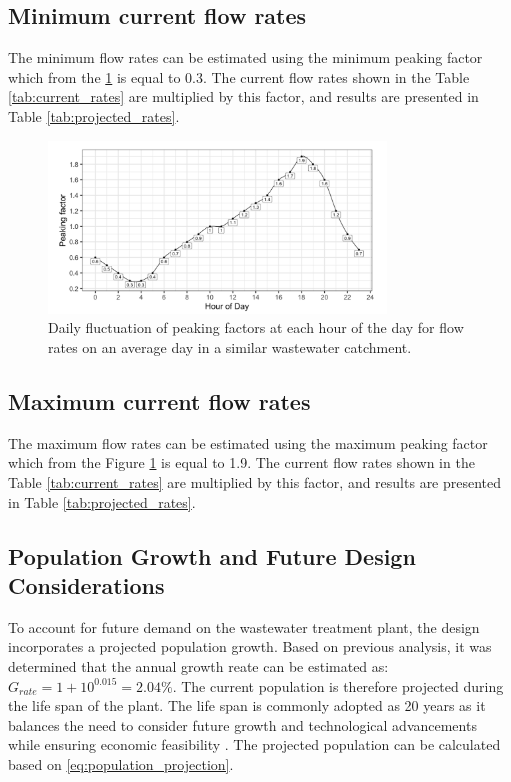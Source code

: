 \documentclass[12pt]{article}
\begin{document}
\subsection{Minimum current flow rates}
\label{sec:minimum_current_flowrates}

The minimum flow rates can be estimated using the minimum peaking factor
which from the \ref{fig:peaking_factor} is equal to 0.3. The current flow rates shown in the Table \ref{tab:current_rates}
are multiplied by this factor, and results are presented in Table \ref{tab:projected_rates}.

\begin{figure}[h]
  \centering
  \includegraphics[width=0.8\textwidth]{../images/peaking_factor.png}
  \caption{Daily fluctuation of peaking factors at each hour of the day for flow rates on an average day in a similar wastewater catchment.}
  \label{fig:peaking_factor}
\end{figure}

\subsection{Maximum current flow rates}
\label{sec:maximum_current_flowrates}

The maximum flow rates can be estimated using the maximum peaking factor
which from the Figure \ref{fig:peaking_factor} is equal to 1.9. The current flow rates shown in the Table \ref{tab:current_rates}
are multiplied by this factor, and results are presented in Table \ref{tab:projected_rates}.

\subsection*{Population Growth and Future Design Considerations}

To account for future demand on the wastewater treatment plant, the design incorporates a projected population 
growth. Based on previous analysis, it was determined that 
the annual growth reate can be estimated as: \(G_{rate} = 1 + 10^{0.015} =2.04\%\).
The current population is therefore projected during the life span of the plant. The life span is 
commonly adopted as 20 years as it balances the need to consider future growth and 
technological advancements while ensuring economic feasibility \cite{wef_DesignWaterResource}.
The projected population can be calculated based on \eqref{eq:population_projection}. 
\end{document}

